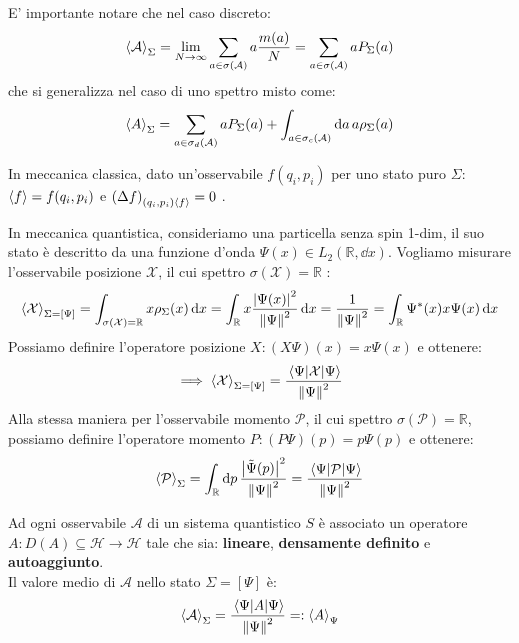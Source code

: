 E' importante notare che nel caso discreto: \[
    \expval{\mathcal{A}}_\Sigma = \lim_{N\to \infty} \sum_{a \in \sigma(\mathcal{A})} a \frac{m(a)}{N} = \sum_{a \in \sigma(\mathcal{A})} a P_\Sigma(a)
\]
che si generalizza nel caso di uno spettro misto come:
\[
    \expval{A}_\Sigma = \sum_{a \in \sigma_d(\mathcal{A})} a P_\Sigma(a) + \int_{a \in \sigma_c(\mathcal{A}) } \dd{a} a \rho_\Sigma(a)
\]

\begin{example}
    In meccanica classica, dato un'osservabile \(f(q_i,p_i)\) per uno stato puro \(\Sigma\): 
    \(\expval{f}= f(q_i, p_i)\) e \(\left( \Delta f \right)_{(q_i,p_i) \expval{f}}=0\) .
\end{example}

\begin{example}
    In meccanica quantistica, consideriamo una particella senza spin 1-dim, il suo stato è descritto da una funzione d'onda \(\Psi(x) \in L_2(\mathbb{R}, \dd{x})\).
    Vogliamo misurare l'osservabile posizione \(\mathcal{X}\), il cui spettro \(\sigma(\mathcal{X}) = \mathbb{R}\) :
    \[
        \expval{\mathcal{X}}_{\Sigma= [\Psi]} = \int_{\sigma(\mathcal{X})= \mathbb{R}} x\rho_\Sigma(x) \dd{x} = \int_{\mathbb{R}} x \frac{\abs{\Psi(x)}^2}{\norm{\Psi}^2} \dd{x}= 
        \frac{1}{\norm{\Psi}^2}= \int_{\mathbb{R}} \Psi^*(x) x \Psi(x) \dd{x}
    \]
    Possiamo definire l'operatore posizione \(X: (X\Psi)(x)= x\Psi(x)\) e ottenere:
    \begin{equation}
        \implies \expval{\mathcal{X}}_{\Sigma= [\Psi]} = \frac{\expval{\mathcal{X}}{\Psi}}{\norm{\Psi}^2}
    \end{equation}
    Alla stessa maniera per l'osservabile momento \(\mathcal{P}\), il cui spettro \(\sigma(\mathcal{P})= \mathbb{R}\),
    possiamo definire l'operatore momento \(P: (P\Psi)(p)= p\Psi(p)\) e ottenere:
    \begin{equation}
        \expval{\mathcal{P}}_{\Sigma} = \int_{\mathbb{R}} \dd{p} \frac{\abs{\tilde{\Psi}(p)}^2}{\norm{\Psi}^2}= \frac{\expval{\mathcal{P}}{\Psi}}{\norm{\Psi}^2}
    \end{equation}

\end{example}

\begin{postulato2}
    Ad ogni osservabile \(\mathcal{A}\) di un sistema quantistico \(S\) è associato un operatore \(A: D(A) \subseteq \mathcal{H} \to \mathcal{H}\) tale che sia:
    \textbf{lineare}, \textbf{densamente definito} e \textbf{autoaggiunto}. \\
    Il valore medio di \(\mathcal{A}\) nello stato \(\Sigma = [\Psi]\) è:
    \begin{equation}
        \expval{\mathcal{A}}_\Sigma = \frac{\expval{A}{\Psi}}{\norm{\Psi}^2} =: \expval{A}_\Psi
    \end{equation}
\end{postulato2}


